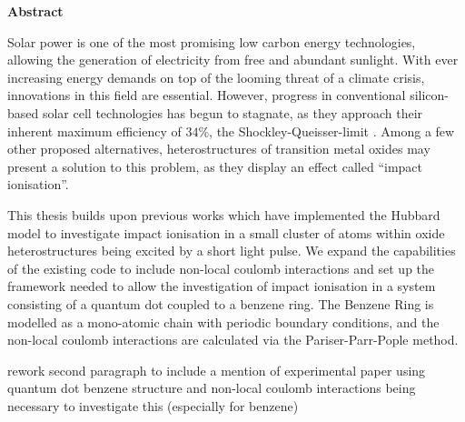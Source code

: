 \def\changemargin#1#2{\list{}{\rightmargin#2\leftmargin#1}\item[]}
\let\endchangemargin=\endlist 

{\small\begin{center}%
\bfseries{Abstract}
\end{center}}

\begin{changemargin}{1cm}{1cm}

Solar power is one of the most promising low carbon energy technologies, allowing the generation of electricity from free and abundant sunlight. With ever increasing energy demands on top of the looming threat of a climate crisis, innovations in this field are essential. However, progress in conventional silicon-based solar cell technologies has begun to stagnate, as they approach their inherent maximum efficiency of $34\%$, the Shockley-Queisser-limit \cite{shockley_queisser}. Among a few other proposed alternatives, heterostructures of transition metal oxides may present a solution to this problem, as they display an effect called ``impact ionisation''.

\smallskip

This thesis builds upon previous works \cite{innerberger, worm_bachelor, prauhart, worm_project} which have implemented the Hubbard model to investigate impact ionisation in a small cluster of atoms within oxide heterostructures being excited by a short light pulse. We expand the capabilities of the existing code to include non-local coulomb interactions and set up the framework needed to allow the investigation of impact ionisation in a system consisting of a quantum dot coupled to a benzene ring. The Benzene Ring is modelled as a mono-atomic chain with periodic boundary conditions, and the non-local coulomb interactions are calculated via the Pariser-Parr-Pople method.

\smallskip
{\color{blue} rework second paragraph to include a mention of experimental paper using quantum dot benzene structure and non-local coulomb interactions being necessary to investigate this (especially for benzene)}
\end{changemargin}